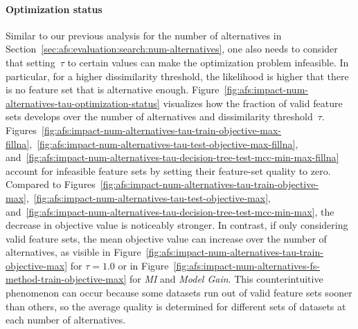 \documentclass{article}
\theoremstyle{definition}
\begin{document}
\paragraph{Optimization status}

Similar to our previous analysis for the number of alternatives in Section~\ref{sec:afs:evaluation:search:num-alternatives}, one also needs to consider that setting~$\tau$ to certain values can make the optimization problem infeasible.
In particular, for a higher dissimilarity threshold, the likelihood is higher that there is no feature set that is alternative enough.
Figure~\ref{fig:afs:impact-num-alternatives-tau-optimization-status} visualizes how the fraction of valid feature sets develops over the number of alternatives and dissimilarity threshold~$\tau$.
Figures~\ref{fig:afs:impact-num-alternatives-tau-train-objective-max-fillna},~\ref{fig:afs:impact-num-alternatives-tau-test-objective-max-fillna}, and~\ref{fig:afs:impact-num-alternatives-tau-decision-tree-test-mcc-min-max-fillna} account for infeasible feature sets by setting their feature-set quality to zero.
Compared to Figures~\ref{fig:afs:impact-num-alternatives-tau-train-objective-max},~\ref{fig:afs:impact-num-alternatives-tau-test-objective-max}, and~\ref{fig:afs:impact-num-alternatives-tau-decision-tree-test-mcc-min-max}, the decrease in objective value is noticeably stronger.
In contrast, if only considering valid feature sets, the mean objective value can increase over the number of alternatives, as visible in Figure~\ref{fig:afs:impact-num-alternatives-tau-train-objective-max} for $\tau=1.0$ or in Figure~\ref{fig:afs:impact-num-alternatives-fs-method-train-objective-max} for \emph{MI} and \emph{Model Gain}.
This counterintuitive phenomenon can occur because some datasets run out of valid feature sets sooner than others, so the average quality is determined for different sets of datasets at each number of alternatives.
\end{document}
